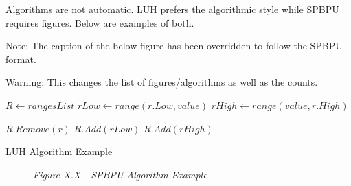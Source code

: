 \label{sec:examples_algorithms}
Algorithms are not automatic. LUH prefers the algorithmic style while SPBPU requires figures. Below are examples of both.

Note: The caption of the below figure has been overridden to follow the SPBPU format. 

Warning: This changes the list of figures/algorithms as well as the counts. 

\begin{algorithm}[H]
    \centering
    \footnotesize
    \begin{algorithmic}[1]
        \State $R \gets rangesList$
            \State $rLow \gets range(r.Low, value)$
            \State $rHigh \gets range(value, r.High)$
            
            \State $R.Remove(r)$
            \State $R.Add(rLow)$
            \State $R.Add(rHigh)$
        \EndProcedure
    \end{algorithmic}
    \caption{LUH Algorithm Example}
    \label{alg:luh_algorithm_example}
\end{algorithm}

\begin{figure}[H]
    \centering
    \footnotesize

    \caption*{\textit{Figure X.X - SPBPU Algorithm Example}} 
\end{figure}